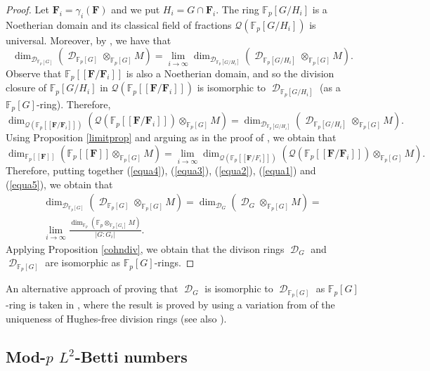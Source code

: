 \documentclass[11pt]{amsart}
\numberwithin{claimcounter}{lem}
\DeclareMathOperator{\D}{\mathcal D}
\newcommand{\F}{\mathbb{F}}
\begin{document}
\begin{proof}
Let $\mathbf F_i= \gamma_i(\mathbf F)$ and we put $H_i=G\cap \mathbf F_i$. The ring $\F_p[G/H_i]$ is a Noetherian domain and its classical field of fractions $\mathcal Q(\F_p[G/H_i])$ is universal. Moreover, by \cite[Theorem 1.2]{Ja20universal}, we have that
\begin{equation}\label{equa4} \dim_{\D_{\F_p[ G]}} ( \D_{\F_p[ G]}\otimes_{\F_p[G]} M)= \lim_{i\to \infty} \dim_{\D_{\F_p[G/H_i]}}(\D_{\F_p[G/H_i]} \otimes_{\F_p[ G]}M ).\end{equation}
 Observe that $\F_p[[\mathbf F/\mathbf F_i]]$ is also a Noetherian domain, and so the division closure of $\F_p[G/H_i]$ in   $\mathcal Q(\F_p[[\mathbf F/\mathbf F_i]])$ is isomorphic to $\D_{\F_p[G/H_i]}$ (as a $\F_p[G]$-ring). Therefore,
\begin{equation}\label{equa3} \dim_{\mathcal Q(\F_p[[\mathbf F/\mathbf F_i]])}(\mathcal Q(\F_p[[\mathbf F/\mathbf F_i]]) \otimes_{\F_p[ G]}M )=\dim_{\D_{\F_p[G/H_i]}}(\D_{\F_p[G/H_i]} \otimes_{\F_p[ G]}M ).\end{equation}
 Using Proposition \ref{limitprop}  and  arguing as in the proof of \cite[Theorem 2.3]{Ja17}, we obtain that
\begin{equation}\label{equa2} \dim_{\F_p[[\mathbf F]]} (\F_p[[\mathbf F]]\otimes_{\F_p[G]} M)= \lim_{i\to \infty} \dim_{\mathcal Q(\F_p[[\mathbf F/F_i]])}(\mathcal Q(\F_p[[\mathbf F/\mathbf F_i]]) \otimes_{\F_p[ G]}M ).\end{equation}
Therefore, putting together (\ref{equa4}), (\ref{equa3}), (\ref{equa2}), (\ref{equa1}) and (\ref{equa5}), we obtain that 
\begin{multline*}
\dim_{\D_{\F_p[ G]}} ( \D_{\F_p[ G]}\otimes_{\F_p[G]} M)=\dim_{\D_G} ( \D_{G}\otimes_{\F_p[G]} M)= \\ 
\lim_{i\to \infty}\frac{\dim_{\F_p}(\F_p \otimes_{\F_p[ G_i]}M )}{|G:G_i|}.\end{multline*}
Applying Proposition \ref{cohndiv}, we obtain that the divison rings $\D_G$ and $\D_{\F_p[G]}$ are isomorphic as  $\F_p[G]$-rings. \end{proof}

An alternative approach of proving  that $\D_G$ is isomorphic to $\D_{\F_p[G]}$ as $\F_p[G]$-ring  is taken in \cite[Lemma 7.5.5]{Mo21}, where  the result is proved by using a variation  from \cite[Theorem 6.3]{Sath09} of the uniqueness of  Hughes-free division rings \cite{Hu70} (see also \cite{DHS08}).
\subsection{Mod-$p$ $L^2$-Betti numbers}
\end{document}
